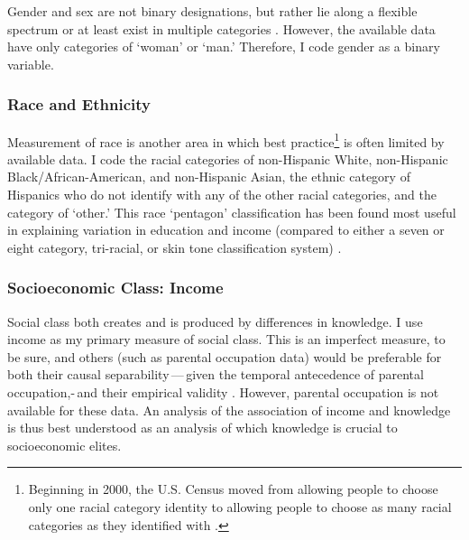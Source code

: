 \documentclass[11pt]{article}
\begin{document}
Gender and sex are not binary designations, but rather lie along a flexible
spectrum or at least exist in multiple categories \citep{Connell2002b,
Fausto-Sterling1993, Fausto-Sterling2000, West1987, Maglioizzi2016}.
However, the available data have only categories of `woman' or
`man.' Therefore, I code gender as a binary variable.

\hypertarget{race-and-ethnicity}{%
\subsubsection{Race and Ethnicity}\label{sec:race-and-ethnicity}}

Measurement of race is another area in which best practice\footnote
  {Beginning in 2000, the U.S. Census moved from allowing people to choose only
  one racial category identity to allowing people to choose as many racial
  categories as they identified with \citep{OfficeofManagementandBudget1997,
  OfficeofManagementandBudget2000}.}
is often limited by available data. I code the racial categories of non-Hispanic
White, non-Hispanic Black/African-American, and non-Hispanic Asian, the ethnic
category of Hispanics who do not identify with any of the other racial
categories, and the category of `other.' This race `pentagon' classification has
been found most useful in explaining variation in education and income (compared
to either a seven or eight category, tri-racial, or skin tone classification
system) \citep{Howell2017}.

\hypertarget{class-income}{%
\subsubsection{Socioeconomic Class: Income}\label{sec:class-income}}

Social class both creates and is produced by differences in knowledge. I use
income as my primary measure of social class. This is an imperfect measure, to
be sure, and others (such as parental occupation data) would be preferable for
both their causal separability\,---\,given the temporal antecedence of parental
occupation,\--\,and their empirical validity \citep{Weeden2005a, Weeden2012}.
However, parental occupation is not available for these data. An analysis of the
association of income and knowledge is thus best understood as an analysis of
which knowledge is crucial to socioeconomic elites.
\end{document}
